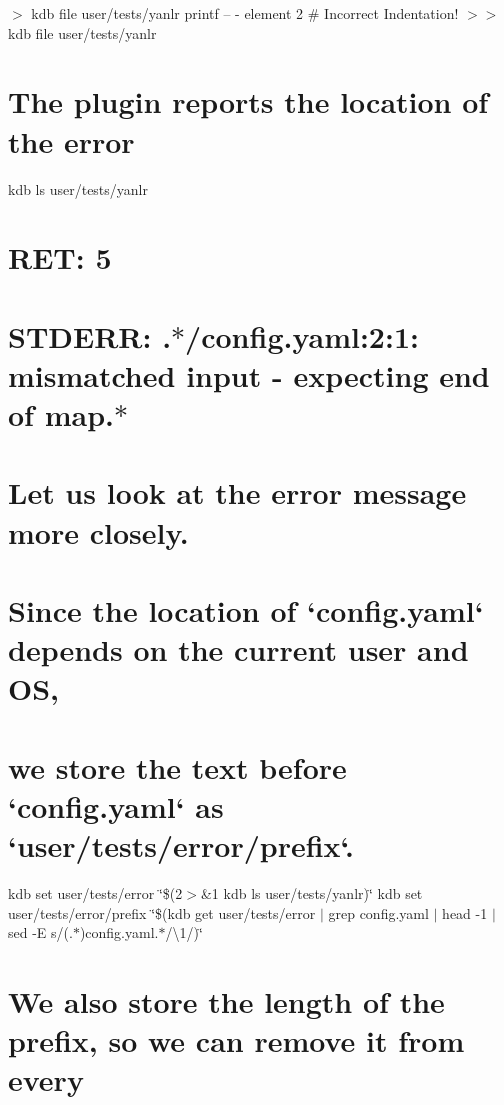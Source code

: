 \textquotesingle{} $>$ {\ttfamily kdb file user/tests/yanlr} printf -- \textquotesingle{}-\/ element 2 \# Incorrect Indentation!\textquotesingle{} $>$$>$ {\ttfamily kdb file user/tests/yanlr}\hypertarget{autotoc_md955_autotoc_md983}{}\section{The plugin reports the location of the error}\label{autotoc_md955_autotoc_md983}
kdb ls user/tests/yanlr \hypertarget{autotoc_md955_autotoc_md984}{}\section{R\+E\+T\+: 5}\label{autotoc_md955_autotoc_md984}
\hypertarget{autotoc_md955_autotoc_md985}{}\section{S\+T\+D\+E\+R\+R\+: .$\ast$/config.\+yaml\+:2\+:1\+: mismatched input \textquotesingle{}-\/ \textquotesingle{} expecting end of map.$\ast$}\label{autotoc_md955_autotoc_md985}
\hypertarget{autotoc_md955_autotoc_md986}{}\section{Let us look at the error message more closely.}\label{autotoc_md955_autotoc_md986}
\hypertarget{autotoc_md955_autotoc_md987}{}\section{Since the location of `config.\+yaml` depends on the current user and O\+S,}\label{autotoc_md955_autotoc_md987}
\hypertarget{autotoc_md955_autotoc_md988}{}\section{we store the text before `config.\+yaml` as `user/tests/error/prefix`.}\label{autotoc_md955_autotoc_md988}
kdb set user/tests/error \char`\"{}\$(2$>$\&1 kdb ls user/tests/yanlr)\char`\"{} kdb set user/tests/error/prefix \char`\"{}\$(kdb get user/tests/error $\vert$ grep \textquotesingle{}config.\+yaml\textquotesingle{} $\vert$ head -\/1 $\vert$ sed -\/\+E \textquotesingle{}s/(.$\ast$)config.\+yaml.$\ast$/\textbackslash{}1/\textquotesingle{})\char`\"{} \hypertarget{autotoc_md955_autotoc_md989}{}\section{We also store the length of the prefix, so we can remove it from every}\label{autotoc_md955_autotoc_md989}
$$
